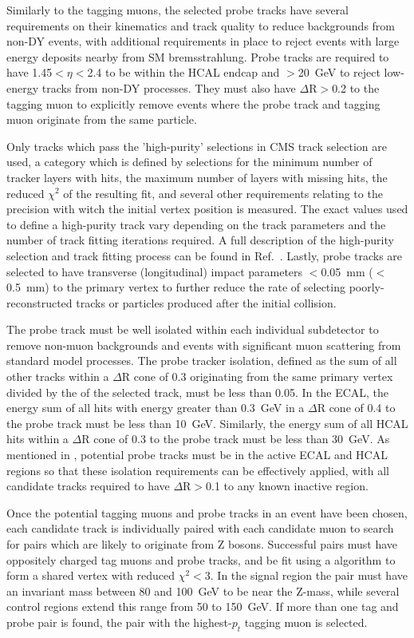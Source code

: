 Similarly to the tagging muons, the selected probe tracks have several requirements on their kinematics and track quality to reduce backgrounds from non-DY events, with additional requirements in place to reject events with large energy deposits nearby from SM bremsstrahlung.
Probe tracks are required to have 1.45$<\eta<$2.4 to be within the HCAL endcap and \pt$>$\SI{20}{\giga\eV} to reject low-energy tracks from non-DY processes.
They must also have $\Delta\mathrm{R}>$0.2 to the tagging muon to explicitly remove events where the probe track and tagging muon originate from the same particle.

Only tracks which pass the 'high-purity' selections in CMS track selection are used, a category which is defined by selections for the minimum number of tracker layers with hits, the maximum number of layers with missing hits, the reduced $\chi^2$ of the resulting fit, and several other requirements relating to the precision with witch the initial vertex position is measured.
The exact values used to define a high-purity track vary depending on the track parameters and the number of track fitting iterations required. 
A full description of the high-purity selection and track fitting process can be found in Ref.~\cite{trackFitting}.
Lastly, probe tracks are selected to have transverse (longitudinal) impact parameters $<$\SI{0.05}{\milli\meter} ($<$\SI{0.5}{\milli\meter}) to the primary vertex to further reduce the rate of selecting poorly-reconstructed tracks or particles produced after the initial collision.

The probe track must be well isolated within each individual subdetector to remove non-muon backgrounds and events with significant muon scattering from standard model processes. 
The probe tracker isolation, defined as the \pt sum of all other tracks within a $\Delta$R cone of 0.3 originating from the same primary vertex divided by the \pt of the selected track, must be less than 0.05.
In the ECAL, the energy sum of all hits with energy greater than \SI{0.3}{\giga\eV} in a $\Delta$R cone of 0.4 to the probe track must be less than \SI{10}{\giga\eV}.
Similarly, the energy sum of all HCAL hits within a $\Delta$R cone of 0.3 to the probe track must be less than \SI{30}{\giga\eV}. 
As mentioned in , potential probe tracks must be in the active ECAL and HCAL regions so that these isolation requirements can be effectively applied, with all candidate tracks required to have $\Delta$R$>$0.1 to any known inactive region.

Once the potential tagging muons and probe tracks in an event have been chosen, each candidate track is individually paired with each candidate muon to search for pairs which are likely to originate from Z bosons.
Successful pairs must have oppositely charged tag muons and probe tracks, and be fit using a \kf algorithm to form a shared vertex with reduced $\chi^2<$3.
In the signal region the pair must have an invariant mass between 80 and \SI{100}{\giga\eV} to be near the Z-mass, while several control regions extend this range from 50 to \SI{150}{\giga\eV}.
If more than one tag and probe pair is found, the pair with the highest-$p_t$ tagging muon is selected.

